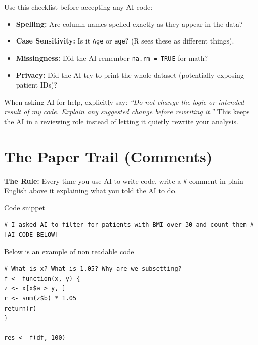 \documentclass[
  letterpaper,
  DIV=11,
  numbers=noendperiod,
  oneside]{scrreprt}
\begin{document}
Use this checklist before accepting any AI code:

\begin{itemize}
\item
  \textbf{Spelling:} Are column names spelled exactly as they appear in
  the data?
\item
  \textbf{Case Sensitivity:} Is it \texttt{Age} or \texttt{age}? (R sees
  these as different things).
\item
  \textbf{Missingness:} Did the AI remember \texttt{na.rm\ =\ TRUE} for
  math?
\item
  \textbf{Privacy:} Did the AI try to print the whole dataset
  (potentially exposing patient IDs)?
\end{itemize}

\begin{tcolorbox}[enhanced jigsaw, title=\textcolor{quarto-callout-tip-color}{\faLightbulb}\hspace{0.5em}{Prompt-engineering tip}, arc=.35mm, toptitle=1mm, colframe=quarto-callout-tip-color-frame, toprule=.15mm, leftrule=.75mm, bottomtitle=1mm, opacityback=0, bottomrule=.15mm, coltitle=black, breakable, opacitybacktitle=0.6, titlerule=0mm, colback=white, left=2mm, colbacktitle=quarto-callout-tip-color!10!white, rightrule=.15mm]

When asking AI for help, explicitly say: \emph{``Do not change the logic
or intended result of my code. Explain any suggested change before
rewriting it.''} This keeps the AI in a reviewing role instead of
letting it quietly rewrite your analysis.

\end{tcolorbox}

\chapter{The Paper Trail (Comments)}\label{the-paper-trail-comments}

\textbf{The Rule:} Every time you use AI to write code, write a
\texttt{\#} comment in plain English above it explaining what you told
the AI to do.

Code snippet

\begin{verbatim}
# I asked AI to filter for patients with BMI over 30 and count them # [AI CODE BELOW]
\end{verbatim}

Below is an example of non readable code

\begin{verbatim}
# What is x? What is 1.05? Why are we subsetting?
f <- function(x, y) {
z <- x[x$a > y, ]
r <- sum(z$b) * 1.05
return(r)
}

res <- f(df, 100)
\end{verbatim}
\end{document}
